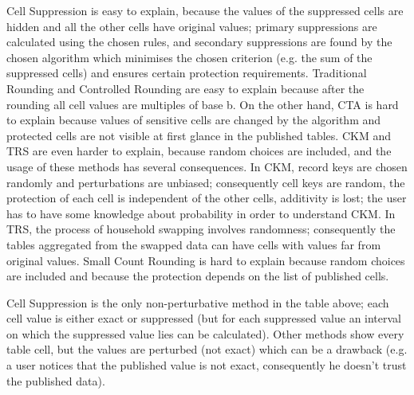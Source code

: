 Cell Suppression is easy to explain, because the values of the suppressed cells are hidden and all the other cells have original values; primary suppressions are calculated using the chosen rules, and secondary suppressions are found by the chosen algorithm which minimises the chosen criterion (e.g. the sum of the suppressed cells) and ensures certain protection requirements.
Traditional Rounding and Controlled Rounding are easy to explain because after the rounding all cell values are multiples of base b.
On the other hand, CTA is hard to explain because values of sensitive cells are changed by the algorithm and protected cells are not visible at first glance in the published tables.
CKM and TRS are even harder to explain, because random choices are included, and the usage of these methods has several consequences. In CKM, record keys are chosen randomly and perturbations are unbiased; consequently cell keys are random, the protection of each cell is independent of the other cells, additivity is lost; the user has to have some knowledge about probability in order to understand CKM. In TRS, the process of household swapping involves randomness; consequently the tables aggregated from the swapped data can have cells with values far from original values.
Small Count Rounding is hard to explain because random choices are included and because the protection depends on the list of published cells.

Cell Suppression is the only non-perturbative method in the table above; each cell value is either exact or suppressed (but for each suppressed value an interval on which the suppressed value lies can be calculated). Other methods show every table cell, but the values are perturbed (not exact) which can be a drawback (e.g. a user notices that the published value is not exact, consequently he doesn't trust the published data).

